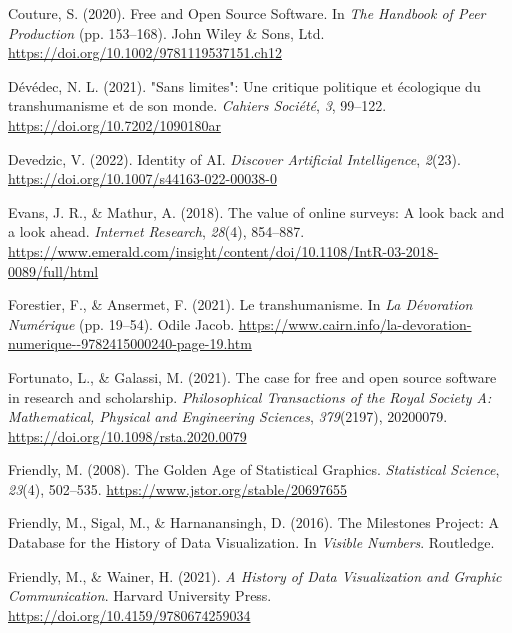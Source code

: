 \documentclass[
  letterpaper,
  DIV=11,
  numbers=noendperiod]{scrreprt}
\newlength{\cslhangindent}
\newlength{\cslentryspacingunit} %
\newenvironment{CSLReferences}[2] %
 {%
  \setlength{\parindent}{0pt}
  \ifodd #1
  \let\oldpar\par
  \def\par{\hangindent=\cslhangindent\oldpar}
  \fi
  \setlength{\parskip}{#2\cslentryspacingunit}
 }%
 {}
\begin{document}
\begin{CSLReferences}{1}{0}
\leavevmode{}%
Couture, S. (2020). Free and {Open Source Software}. In \emph{The
{Handbook} of {Peer Production}} (pp. 153--168). John Wiley \& Sons,
Ltd. \url{https://doi.org/10.1002/9781119537151.ch12}

\leavevmode{}%
Dévédec, N. L. (2021). "{Sans} limites": Une critique politique et
écologique du transhumanisme et de son monde. \emph{Cahiers Société},
\emph{3}, 99--122. \url{https://doi.org/10.7202/1090180ar}

\leavevmode{}%
Devedzic, V. (2022). Identity of {AI}. \emph{Discover Artificial
Intelligence}, \emph{2}(23).
\url{https://doi.org/10.1007/s44163-022-00038-0}

\leavevmode{}%
Evans, J. R., \& Mathur, A. (2018). The value of online surveys: {A}
look back and a look ahead. \emph{Internet Research}, \emph{28}(4),
854--887.
\url{https://www.emerald.com/insight/content/doi/10.1108/IntR-03-2018-0089/full/html}

\leavevmode{}%
Forestier, F., \& Ansermet, F. (2021). Le transhumanisme. In \emph{La
{Dévoration Numérique}} (pp. 19--54). Odile Jacob.
\url{https://www.cairn.info/la-devoration-numerique--9782415000240-page-19.htm}

\leavevmode{}%
Fortunato, L., \& Galassi, M. (2021). The case for free and open source
software in research and scholarship. \emph{Philosophical Transactions
of the Royal Society A: Mathematical, Physical and Engineering
Sciences}, \emph{379}(2197), 20200079.
\url{https://doi.org/10.1098/rsta.2020.0079}

\leavevmode{}%
Friendly, M. (2008). The {Golden Age} of {Statistical Graphics}.
\emph{Statistical Science}, \emph{23}(4), 502--535.
\url{https://www.jstor.org/stable/20697655}

\leavevmode{}%
Friendly, M., Sigal, M., \& Harnanansingh, D. (2016). The {Milestones
Project}: {A Database} for the {History} of {Data Visualization}. In
\emph{Visible {Numbers}}. Routledge.

\leavevmode{}%
Friendly, M., \& Wainer, H. (2021). \emph{A {History} of {Data
Visualization} and {Graphic Communication}}. Harvard University Press.
\url{https://doi.org/10.4159/9780674259034}


\end{CSLReferences}
\end{document}
